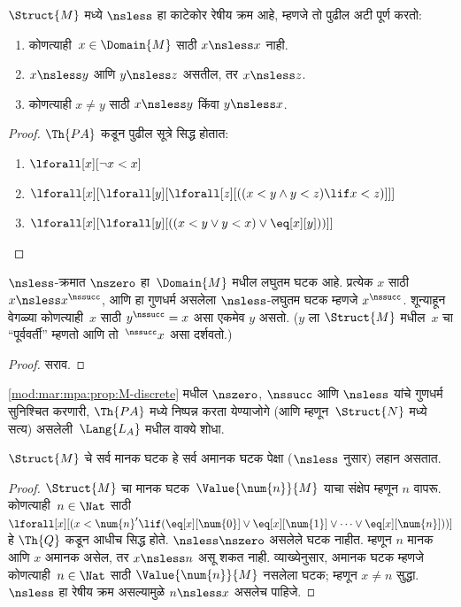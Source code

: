 \begin{prop}
$\Struct{M}$ मध्ये $\nsless$ हा काटेकोर रेषीय क्रम आहे, म्हणजे तो पुढील
अटी पूर्ण करतो:
\begin{enumerate}
\item कोणत्याही~$x \in \Domain{M}$ साठी $x \nsless x$ नाही.
\item $x \nsless y$ आणि $y \nsless z$ असतील, तर $x \nsless z$.
\item कोणत्याही $x \neq y$ साठी $x \nsless y$ किंवा $y \nsless x$.
\end{enumerate}
\end{prop}

\begin{proof}
$\Th{PA}$ कडून पुढील सूत्रे सिद्ध होतात:
\begin{enumerate}
\item $\lforall[x][\lnot x < x]$
\item $\lforall[x][\lforall[y][\lforall[z][((x < y \land y < z) \lif x < z)]]]$
\item $\lforall[x][\lforall[y][((x < y \lor y < x) \lor \eq[x][y]))]]$
\end{enumerate}
\end{proof}

\begin{prop}
\label{mod:mar:mpa:prop:M-discrete} $\nsless$-क्रमात $\nszero$ हा~$\Domain{M}$ मधील
लघुतम घटक आहे. प्रत्येक $x$ साठी $x \nsless x^\nssucc$, आणि हा
गुणधर्म असलेला $\nsless$-लघुतम घटक म्हणजे $x^\nssucc$. शून्याहून
वेगळ्या कोणत्याही~$x$ साठी $y^\nssucc = x$ असा एकमेव $y$ असतो. ($y$ ला
$\Struct{M}$ मधील~$x$ चा ``पूर्ववर्ती'' म्हणतो आणि तो~$^\nssucc x$ असा
दर्शवतो.)

\end{prop}

\begin{proof}
सराव.
\end{proof}

\begin{prob}
\ref{mod:mar:mpa:prop:M-discrete} मधील $\nszero$, $\nssucc$ आणि
$\nsless$ यांचे गुणधर्म सुनिश्चित करणारी, $\Th{PA}$ मध्ये निष्पन्न करता येण्याजोगे
(आणि म्हणून~$\Struct{N}$ मध्ये सत्य) असलेली~$\Lang{L_A}$ मधील
वाक्ये शोधा.
\end{prob}

\begin{prop}
$\Struct{M}$ चे सर्व मानक घटक हे सर्व अमानक घटक पेक्षा
($\nsless$ नुसार) लहान असतात.
\end{prop}

\begin{proof}
$\Struct{M}$ चा मानक घटक~$\Value{\num{n}}{M}$ याचा संक्षेप म्हणून
$n$ वापरू. कोणत्याही~$n \in \Nat$ साठी
$\lforall[x][(x < \num{n}' \lif (\eq[x][\num{0}] \lor
  \eq[x][\num{1}] \lor \dots \lor \eq[x][\num{n}]))]$ हे $\Th{Q}$
कडून आधीच सिद्ध होते. $\nsless \nszero$ असलेले घटक
नाहीत. म्हणून $n$ मानक आणि $x$ अमानक असेल, तर $x \nsless n$ असू शकत
नाही. व्याख्येनुसार, अमानक घटक म्हणजे कोणत्याही~$n \in \Nat$ साठी
$\Value{\num{n}}{M}$ नसलेला घटक; म्हणून $x \neq n$ सुद्धा. $\nsless$
हा रेषीय क्रम असल्यामुळे $n \nsless x$ असलेच पाहिजे.
\end{proof}

